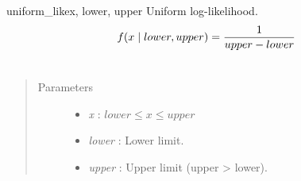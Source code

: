 \hypertarget{pymc.distributions.uniform_like}{}\begin{funcdesc}{uniform\_like}{x, lower, upper}
Uniform log-likelihood.
\begin{gather}
\begin{split}f(x \mid lower, upper) = \frac{1}{upper-lower}\end{split}\notag\\\begin{split}\end{split}\notag
\end{gather}\begin{quote}\begin{description}
\item[Parameters] \leavevmode\begin{itemize}
\item {} 
\emph{x} : $lower \leq x \leq upper$

\item {} 
\emph{lower} : Lower limit.

\item {} 
\emph{upper} : Upper limit (upper \textgreater{} lower).

\end{itemize}

\end{description}\end{quote}
\end{funcdesc}

